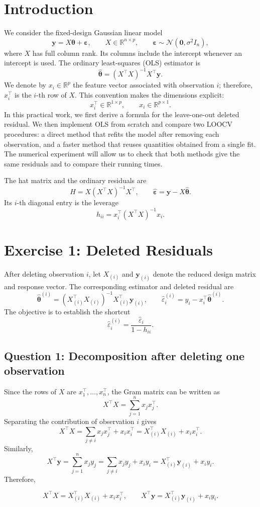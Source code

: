 \documentclass[11pt,a4paper]{article}
\newcommand{\R}{\mathbb{R}}
\newcommand{\thetahat}{\widehat{\bm\theta}}
\newcommand{\epshat}{\widehat{\bm\varepsilon}}
\begin{document}
\section{Introduction}
We consider the fixed-design Gaussian linear model
\[
    \bm y = X\bm\theta + \bm\varepsilon,
    \qquad
    X\in\R^{n\times p},
    \qquad
    \bm\varepsilon\sim\mathcal N(\bm 0,\sigma^2 I_n),
\]
where $X$ has full column rank. Its columns include the intercept whenever an
intercept is used. The ordinary least-squares (OLS) estimator is
\[
    \thetahat=(X^\top X)^{-1}X^\top\bm y.
\]
We denote by $x_i\in\R^p$ the feature vector associated with observation $i$;
therefore, $x_i^\top$ is the $i$-th row of $X$. This convention makes the
dimensions explicit:
\[
    x_i^\top\in\R^{1\times p},
    \qquad
    x_i\in\R^{p\times 1}.
\]
In this practical work, we first derive a formula for the leave-one-out
deleted residual. We then implement OLS from scratch and compare two LOOCV
procedures: a direct method that refits the model after removing each
observation, and a faster method that reuses quantities obtained from a single
fit. The numerical experiment will allow us to check that both methods give
the same residuals and to compare their running times.
\begin{methodbox}
The hat matrix and the ordinary residuals are
\[
    H=X(X^\top X)^{-1}X^\top,
    \qquad
    \epshat=\bm y-X\thetahat.
\]
Its $i$-th diagonal entry is the leverage
\[
    h_{ii}=x_i^\top(X^\top X)^{-1}x_i.
\]
\end{methodbox}
\section{Exercise 1: Deleted Residuals}
After deleting observation $i$, let $X_{(i)}$ and $\bm y_{(i)}$ denote the
reduced design matrix and response vector. The corresponding estimator and
deleted residual are
\[
    \widehat{\bm\theta}^{(i)}
    =\left(X_{(i)}^\top X_{(i)}\right)^{-1}
      X_{(i)}^\top\bm y_{(i)},
    \qquad
    \widehat{\varepsilon}^{(i)}_i
    =y_i-x_i^\top\widehat{\bm\theta}^{(i)}.
\]
The objective is to establish the shortcut
\[
    \boxed{
    \widehat{\varepsilon}^{(i)}_i
    =\frac{\widehat{\varepsilon}_i}{1-h_{ii}}
    }.
\]
\subsection{Question 1: Decomposition after deleting one observation}
Since the rows of $X$ are $x_1^\top,\ldots,x_n^\top$, the Gram matrix can be
written as
\[
    X^\top X=\sum_{j=1}^{n}x_jx_j^\top.
\]
Separating the contribution of observation $i$ gives
\[
    X^\top X
    =\sum_{j\neq i}x_jx_j^\top+x_ix_i^\top
    =X_{(i)}^\top X_{(i)}+x_ix_i^\top.
\]
Similarly,
\[
    X^\top\bm y
    =\sum_{j=1}^{n}x_jy_j
    =\sum_{j\neq i}x_jy_j+x_iy_i
    =X_{(i)}^\top\bm y_{(i)}+x_iy_i.
\]
Therefore,
\begin{resultbox}
\[
    \boxed{X^\top X=X_{(i)}^\top X_{(i)}+x_ix_i^\top},
    \qquad
    \boxed{X^\top\bm y=X_{(i)}^\top\bm y_{(i)}+x_iy_i}.
\]
\end{resultbox}
\end{document}
